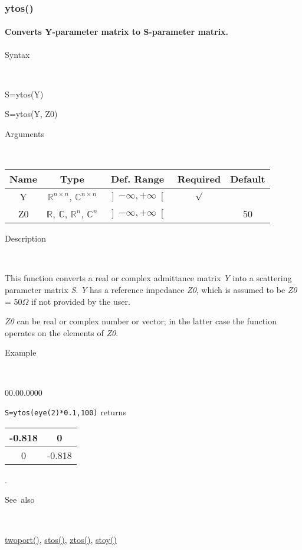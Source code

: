 \newpage
\subsubsection*{\hypertarget{ytos}{}{\Large ytos()}}


\paragraph{\label{par:ytos}Converts Y-parameter matrix to S-parameter matrix.}

\begin{description}
\item [Syntax]~
\end{description}
S=ytos(Y)

\noindent S=ytos(Y, Z0)

\begin{description}
\item [Arguments]~
\end{description}
\begin{tabular}{|c|c|c|c|c|}
\hline 
Name&
Type&
Def. Range&
Required&
Default\tabularnewline
\hline
\hline 
Y&
$\mathbb{R}^{n\times n}$, $\mathbb{C}^{n\times n}$&
$\left]-\infty,+\infty\right[$&
$\surd$&
\tabularnewline
\hline
Z0&
$\mathbb{R}$, $\mathbb{C}$, $\mathbb{R}^{n}$, $\mathbb{C}^{n}$&
$\left]-\infty,+\infty\right[$&
&
50\tabularnewline
\hline
\end{tabular}

\begin{description}
\item [Description]~
\end{description}
This function converts a real or complex admittance matrix \textit{Y}
into a scattering parameter matrix \textit{S}. \textit{Y} has a reference
impedance \textit{Z0}, which is assumed to be \textit{Z0} = 50$\Omega$
if not provided by the user.

\noindent \textit{Z0} can be real or complex number or vector; in
the latter case the function operates on the elements of \textit{Z0}.

\begin{description}
\item [Example]~
\end{description}
\begin{lyxlist}{00.00.0000}
\item [\texttt{S=ytos(eye(2){*}0.1,100)}]returns \begin{tabular}{|c|c|}
\hline 
-0.818&
0\tabularnewline
\hline
0&
-0.818\tabularnewline
\hline
\end{tabular}.
\end{lyxlist}
\begin{description}
\item [See~also]~
\end{description}
\textcolor{blue}{\hyperlink{twoport}{twoport()}}\textcolor{black}{,}
\textcolor{blue}{\hyperlink{stos}{stos()}}\textcolor{black}{,} \textcolor{blue}{\hyperlink{ztos}{ztos()}}\textcolor{black}{,}
\textcolor{blue}{\hyperlink{stoy}{stoy()}}


